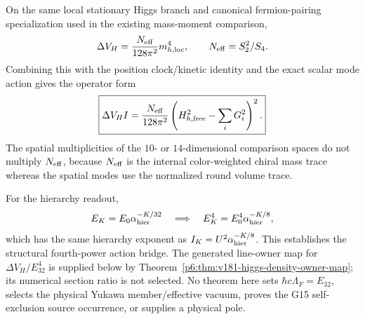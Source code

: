 \documentclass[11pt,a4paper]{article}
\begin{document}
\begin{theorem}
\label{p6:thm:v180-fourth-power-scalar-mass-operator}
On the same local stationary Higgs branch and canonical fermion-pairing
specialization used in the existing mass-moment comparison,
\[
 \Delta V_H=\frac{N_{\rm eff}}{128\pi^2}m_{h,\rm loc}^4,
 \qquad N_{\rm eff}=S_2^2/S_4.
\]
Combining this with the position clock/kinetic identity and the exact scalar
mode action gives the operator form
\[
 \boxed{
 \Delta V_H I=\frac{N_{\rm eff}}{128\pi^2}
 \left(H_{h,\rm free}^2-\sum_iG_i^2\right)^2.}
\]
The spatial multiplicities of the $10$- or $14$-dimensional comparison
spaces do not multiply $N_{\rm eff}$, because $N_{\rm eff}$ is the internal
color-weighted chiral mass trace whereas the spatial modes use the normalized
round volume trace.

For the hierarchy readout,
\[
 E_K=E_0\alpha_{\rm hier}^{-K/32}
 \quad\Longrightarrow\quad
 E_K^4=E_0^4\alpha_{\rm hier}^{-K/8},
\]
which has the same hierarchy exponent as
$I_K=U^2\alpha_{\rm hier}^{-K/8}$.  This establishes the structural fourth-power action bridge.  The generated
line-owner map for $\Delta V_H/E_{32}^4$ is supplied below by
Theorem~\ref{p6:thm:v181-higgs-density-owner-map}; its numerical section
ratio is not selected.  No theorem here sets $\hbar c\Lambda_F=E_{32}$,
selects the physical Yukawa member/effective vacuum, proves the G15
self-exclusion source occurrence, or supplies a physical pole.
\end{theorem}
\end{document}
